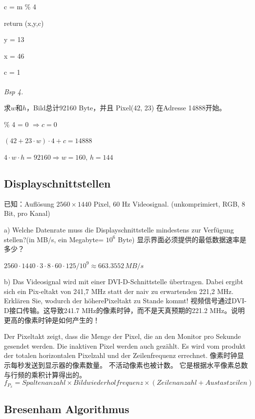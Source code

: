 \documentclass[fleqn]{article}
\begin{document}
\indent\indent\indent c = m \% 4

\indent\indent\indent return (x,y,c)

\indent\indent y = 13

\indent\indent x = 46

\indent\indent c = 1
\\
\\
\noindent\textit{Bsp 4.}

求$w$和$h$，Bild总计92160 Byte，并且 Pixel(42, 23) 在Adresse 14888开始。

\indent{}\% 4 = 0 $\Rightarrow c=0$

\indent\indent $(42+23\cdot w)\cdot 4 +c=14888$

\indent\indent $4\cdot w\cdot h=92160\Rightarrow w=160,\,h=144$

\subsection{Displayschnittstellen}

\noindent 已知：Auflösung $2560\times 1440$ Pixel, 60 Hz Videosignal. (unkomprimiert, RGB, 8 Bit, pro Kanal)

a) Welche Datenrate muss die Displayschnittstelle mindestens zur Verfügung stellen?(in MB/s, ein Megabyte= $10^6$ Byte) 显示界面必须提供的最低数据速率是多少？

$2560\cdot 1440\cdot 3\cdot 8\cdot 60\cdot 125/10^9 \approx 663.3552\, MB/s$

b) Das Videosignal wird mit einer DVI-D-Schnittstelle übertragen. Dabei ergibt sich ein Pix-eltakt von 241,7 MHz statt der naiv zu erwartenden 221,2 MHz. Erklären Sie, wodurch der höherePixeltakt zu Stande kommt! 视频信号通过DVI-D接口传输。这导致241.7 MHz的像素时钟，而不是天真预期的221.2 MHz。说明更高的像素时钟是如何产生的！

Der Pixeltakt zeigt, dass die Menge der Pixel, die an den Monitor pro Sekunde gesendet werden. Die inaktiven Pixel werden auch gezählt. Es wird vom produkt der totalen horizontalen Pixelzahl und der Zeilenfrequenz errechnet.
像素时钟显示每秒发送到显示器的像素数量。 不活动像素也被计数。 它是根据水平像素总数与行频的乘积计算得出的。
$$f_{P_x}=Spaltenanzahl \times Bildwiederholfrequenz \times (Zeilenanzahl + Austastzeilen)$$

\subsection{Bresenham Algorithmus}
\end{document}
